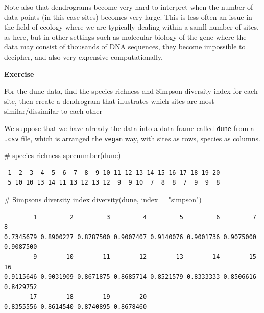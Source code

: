\documentclass[
  letterpaper,
  DIV=11,
  numbers=noendperiod]{scrreprt}
\newenvironment{Shaded}{\begin{snugshade}}{\end{snugshade}}
\newcommand{\AttributeTok}[1]{\textcolor[rgb]{0.40,0.45,0.13}{#1}}
\newcommand{\CommentTok}[1]{\textcolor[rgb]{0.37,0.37,0.37}{#1}}
\newcommand{\FunctionTok}[1]{\textcolor[rgb]{0.28,0.35,0.67}{#1}}
\newcommand{\NormalTok}[1]{\textcolor[rgb]{0.00,0.23,0.31}{#1}}
\newcommand{\StringTok}[1]{\textcolor[rgb]{0.13,0.47,0.30}{#1}}
\begin{document}
Note also that dendrograms become very hard to interpret when the number
of data points (in this case sites) becomes very large. This is less
often an issue in the field of ecology where we are typically dealing
within a samll number of sites, as here, but in other settings such as
molecular biology of the gene where the data may consist of thousands of
DNA sequences, they become impossible to decipher, and also very
expensive computationally.

\textbf{Exercise}

For the dune data, find the species richness and Simpson diversity index
for each site, then create a dendrogram that illustrates which sites are
most similar/dissimilar to each other

We suppose that we have already the data into a data frame called
\texttt{dune} from a \texttt{.csv} file, which is arranged the
\texttt{vegan} way, with sites as rows, species as columns.

\begin{Shaded}
\begin{Highlighting}[]
\CommentTok{\# species richness}
\FunctionTok{specnumber}\NormalTok{(dune)}
\end{Highlighting}
\end{Shaded}

\begin{verbatim}
 1  2  3  4  5  6  7  8  9 10 11 12 13 14 15 16 17 18 19 20 
 5 10 10 13 14 11 13 12 13 12  9  9 10  7  8  8  7  9  9  8 
\end{verbatim}

\begin{Shaded}
\begin{Highlighting}[]
\CommentTok{\# Simpson\textquotesingle{}s diversity index}
\FunctionTok{diversity}\NormalTok{(dune, }\AttributeTok{index =} \StringTok{"simpson"}\NormalTok{)}
\end{Highlighting}
\end{Shaded}

\begin{verbatim}
        1         2         3         4         5         6         7         8 
0.7345679 0.8900227 0.8787500 0.9007407 0.9140076 0.9001736 0.9075000 0.9087500 
        9        10        11        12        13        14        15        16 
0.9115646 0.9031909 0.8671875 0.8685714 0.8521579 0.8333333 0.8506616 0.8429752 
       17        18        19        20 
0.8355556 0.8614540 0.8740895 0.8678460 
\end{verbatim}
\end{document}

